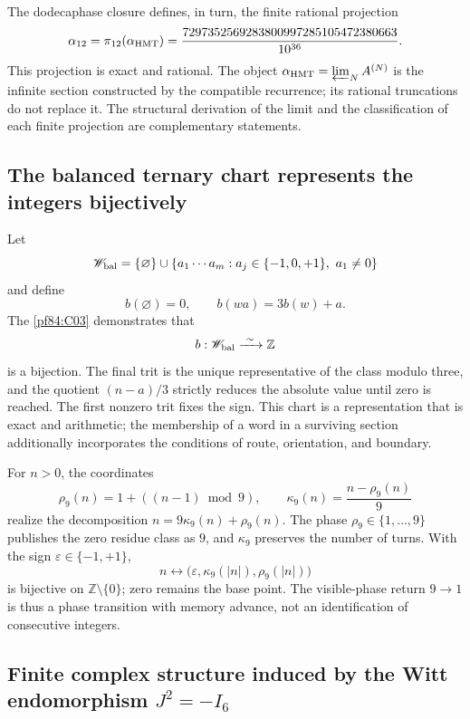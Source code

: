 The dodecaphase closure defines, in turn, the finite rational projection
\begin{equation}
 \alpha_{12}=\pi_{12}(\alpha_{\rm HMT})
 =\frac{7297352569283800997285105472380663}{10^{36}}.
 \label{p3-83-c44-s1:eq:alpha-racional-taxonomia-rev11}
\end{equation}
This projection is exact and rational. The object
\(\alpha_{\rm HMT}=\varprojlim_NA^{(N)}\) is the infinite section constructed
by the compatible recurrence; its rational truncations do not replace it.
The structural derivation of the limit and the classification of each
finite projection are complementary statements.

\subsection{The balanced ternary chart represents the integers
bijectively}

Let
\[
 \mathscr W_{\rm bal}
 =\{\varnothing\}\cup
 \{a_1\cdots a_m:
 a_j\in\{-1,0,+1\},\ a_1\neq0\}
\]
and define
\[
 b(\varnothing)=0,
 \qquad
 b(wa)=3b(w)+a.
\]
The \cref{pf84:C03} demonstrates that
\begin{equation}
 b:\mathscr W_{\rm bal}\xrightarrow{\ \sim\ }\mathbb Z
 \label{p3-83-c44-s1:eq:carta-entera-balanceada-rev11}
\end{equation}
is a bijection. The final trit is the unique representative of the
class modulo three, and the quotient \((n-a)/3\) strictly reduces the absolute
value until zero is reached. The first nonzero trit fixes the sign. This chart
is a representation that is exact and arithmetic; the membership of a word in a
surviving section additionally incorporates the conditions of route,
orientation, and boundary.

For \(n>0\), the coordinates
\[
 \rho_9(n)=1+((n-1)\bmod9),
 \qquad
 \kappa_9(n)=\frac{n-\rho_9(n)}9
\]
realize the decomposition \(n=9\kappa_9(n)+\rho_9(n)\). The phase
\(\rho_9\in\{1,\ldots,9\}\) publishes the zero residue class as \(9\), and
\(\kappa_9\) preserves the number of turns. With the sign
\(\varepsilon\in\{-1,+1\}\),
\[
 n\longleftrightarrow
 \bigl(\varepsilon,\kappa_9(|n|),\rho_9(|n|)\bigr)
\]
is bijective on \(\mathbb Z\setminus\{0\}\); zero remains the base
point. The visible-phase return \(9\to1\) is thus a phase transition with
memory advance, not an identification of consecutive integers.

\subsection{Finite complex structure induced by the Witt endomorphism
\texorpdfstring{\(J^2=-I_6\)}{J²=-I₆}}


